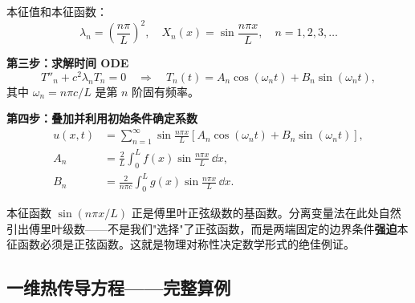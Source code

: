 本征值和本征函数：
\begin{equation}
\lambda_n = \left(\frac{n\pi}{L}\right)^2,\quad
X_n(x) = \sin\frac{n\pi x}{L},\quad n=1,2,3,\dots
\label{eq:wave_eigen}
\end{equation}

\textbf{第三步：求解时间 ODE}
\begin{equation}
T''_n + c^2\lambda_n T_n = 0 \quad\Longrightarrow\quad
T_n(t) = A_n\cos(\omega_n t) + B_n\sin(\omega_n t),
\end{equation}
其中 $\omega_n = n\pi c/L$ 是第 $n$ 阶固有频率。

\textbf{第四步：叠加并利用初始条件确定系数}
\begin{align}
u(x,t) &= \sum_{n=1}^{\infty} \sin\frac{n\pi x}{L}
\left[A_n\cos(\omega_n t) + B_n\sin(\omega_n t)\right],\\
A_n &= \frac{2}{L}\int_0^L f(x)\sin\frac{n\pi x}{L}\,\dd x,\\
B_n &= \frac{2}{n\pi c}\int_0^L g(x)\sin\frac{n\pi x}{L}\,\dd x.
\end{align}

\begin{insight}
本征函数 $\sin(n\pi x/L)$ 正是傅里叶正弦级数的基函数。分离变量法在此处自然引出傅里叶级数——不是我们"选择"了正弦函数，而是两端固定的边界条件\textbf{强迫}本征函数必须是正弦函数。这就是物理对称性决定数学形式的绝佳例证。
\end{insight}

\subsection{一维热传导方程——完整算例}

